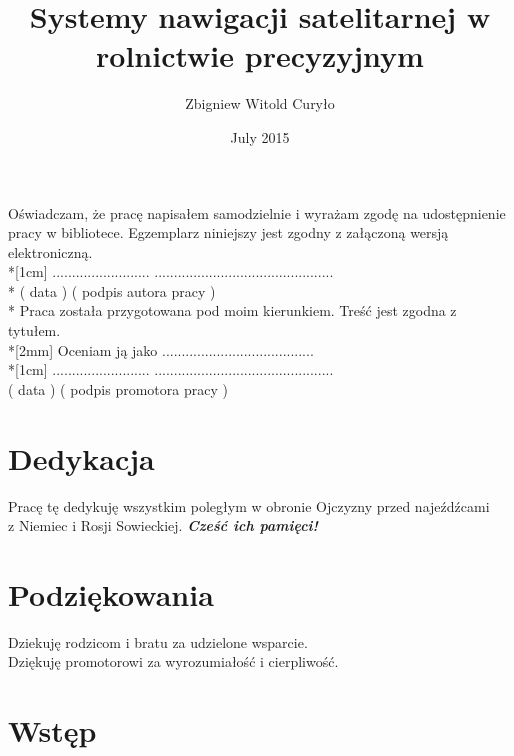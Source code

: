\documentclass[a4paper,2pt,twoside]{report} %
\title{Systemy nawigacji satelitarnej w rolnictwie precyzyjnym}
\author{Zbigniew Witold Curyło}
\date{July 2015}
\begin{document}
 \sloppy



\chapter*{}
		Oświadczam, że pracę napisałem samodzielnie i wyrażam zgodę na udostępnienie pracy w bibliotece.
		Egzemplarz niniejszy jest zgodny z załączoną wersją elektroniczną.\\*[1cm]
		......................... \hfill ..............................................\\*
		\hspace*{0.5cm} ( data ) \hfill ( podpis autora pracy ) \hspace*{0.5cm}\\* 
		\vfill
		\noindent Praca została przygotowana pod moim kierunkiem. Treść jest zgodna z tytułem.\\*[2mm]
		Oceniam ją jako .......................................\\*[1cm]
		......................... \hfill ..............................................\\
		\hspace*{0.5cm} ( data ) \hfill ( podpis promotora pracy ) \hspace*{2mm}\\			
 		\vfill
\chapter*{Dedykacja}
\justify
Pracę tę dedykuję wszystkim poległym w obronie Ojczyzny przed najeźdźcami\\ z Niemiec i Rosji Sowieckiej.
\textbf{\textit{Cześć ich pamięci!}}
\chapter*{Podziękowania}
Dziekuję rodzicom i bratu za udzielone wsparcie.\\Dziękuję promotorowi za wyrozumiałość i cierpliwość.

\tableofcontents
\newpage
{}

\chapter{Wstęp}

\end{document}
